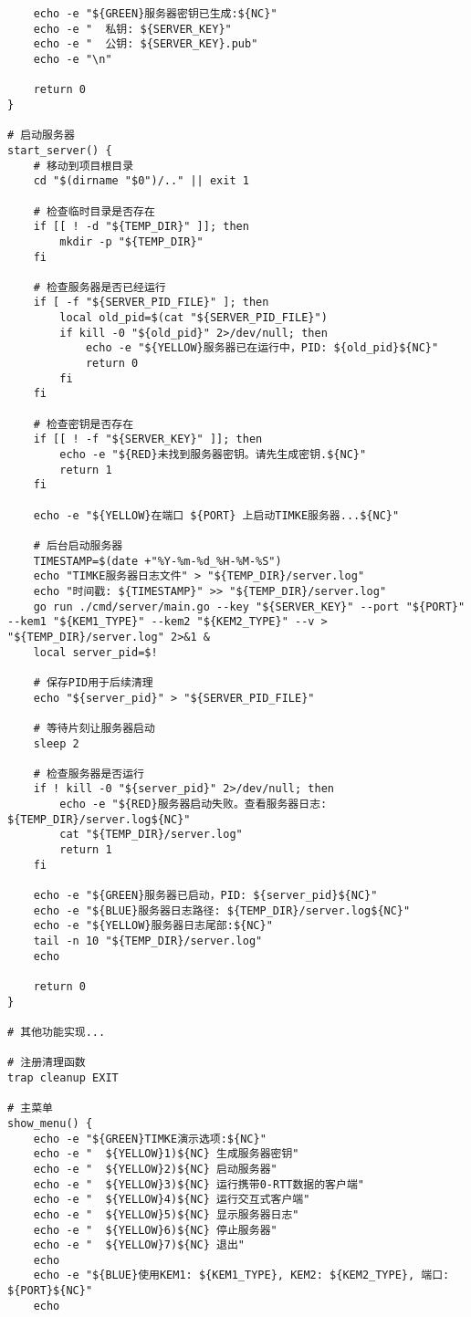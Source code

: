 \begin{verbatim}
    echo -e "${GREEN}服务器密钥已生成:${NC}"
    echo -e "  私钥: ${SERVER_KEY}"
    echo -e "  公钥: ${SERVER_KEY}.pub"
    echo -e "\n"
    
    return 0
}

# 启动服务器
start_server() {
    # 移动到项目根目录
    cd "$(dirname "$0")/.." || exit 1

    # 检查临时目录是否存在
    if [[ ! -d "${TEMP_DIR}" ]]; then
        mkdir -p "${TEMP_DIR}"
    fi

    # 检查服务器是否已经运行
    if [ -f "${SERVER_PID_FILE}" ]; then
        local old_pid=$(cat "${SERVER_PID_FILE}")
        if kill -0 "${old_pid}" 2>/dev/null; then
            echo -e "${YELLOW}服务器已在运行中，PID: ${old_pid}${NC}"
            return 0
        fi
    fi

    # 检查密钥是否存在
    if [[ ! -f "${SERVER_KEY}" ]]; then
        echo -e "${RED}未找到服务器密钥。请先生成密钥.${NC}"
        return 1
    fi

    echo -e "${YELLOW}在端口 ${PORT} 上启动TIMKE服务器...${NC}"
    
    # 后台启动服务器
    TIMESTAMP=$(date +"%Y-%m-%d_%H-%M-%S")
    echo "TIMKE服务器日志文件" > "${TEMP_DIR}/server.log"
    echo "时间戳: ${TIMESTAMP}" >> "${TEMP_DIR}/server.log"
    go run ./cmd/server/main.go --key "${SERVER_KEY}" --port "${PORT}" --kem1 "${KEM1_TYPE}" --kem2 "${KEM2_TYPE}" --v > "${TEMP_DIR}/server.log" 2>&1 &
    local server_pid=$!
    
    # 保存PID用于后续清理
    echo "${server_pid}" > "${SERVER_PID_FILE}"
    
    # 等待片刻让服务器启动
    sleep 2
    
    # 检查服务器是否运行
    if ! kill -0 "${server_pid}" 2>/dev/null; then
        echo -e "${RED}服务器启动失败。查看服务器日志: ${TEMP_DIR}/server.log${NC}"
        cat "${TEMP_DIR}/server.log"
        return 1
    fi
    
    echo -e "${GREEN}服务器已启动，PID: ${server_pid}${NC}"
    echo -e "${BLUE}服务器日志路径: ${TEMP_DIR}/server.log${NC}"
    echo -e "${YELLOW}服务器日志尾部:${NC}"
    tail -n 10 "${TEMP_DIR}/server.log"
    echo
    
    return 0
}

# 其他功能实现...

# 注册清理函数
trap cleanup EXIT

# 主菜单
show_menu() {
    echo -e "${GREEN}TIMKE演示选项:${NC}"
    echo -e "  ${YELLOW}1)${NC} 生成服务器密钥"
    echo -e "  ${YELLOW}2)${NC} 启动服务器"
    echo -e "  ${YELLOW}3)${NC} 运行携带0-RTT数据的客户端"
    echo -e "  ${YELLOW}4)${NC} 运行交互式客户端"
    echo -e "  ${YELLOW}5)${NC} 显示服务器日志"
    echo -e "  ${YELLOW}6)${NC} 停止服务器"
    echo -e "  ${YELLOW}7)${NC} 退出"
    echo
    echo -e "${BLUE}使用KEM1: ${KEM1_TYPE}, KEM2: ${KEM2_TYPE}, 端口: ${PORT}${NC}"
    echo
    

\end{verbatim}

